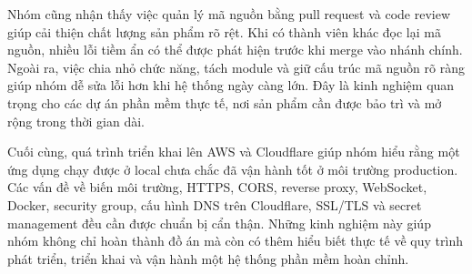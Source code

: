 \par Nhóm cũng nhận thấy việc quản lý mã nguồn bằng pull request và code review giúp cải thiện chất lượng sản phẩm rõ rệt. Khi có thành viên khác đọc lại mã nguồn, nhiều lỗi tiềm ẩn có thể được phát hiện trước khi merge vào nhánh chính. Ngoài ra, việc chia nhỏ chức năng, tách module và giữ cấu trúc mã nguồn rõ ràng giúp nhóm dễ sửa lỗi hơn khi hệ thống ngày càng lớn. Đây là kinh nghiệm quan trọng cho các dự án phần mềm thực tế, nơi sản phẩm cần được bảo trì và mở rộng trong thời gian dài.

\par Cuối cùng, quá trình triển khai lên AWS và Cloudflare giúp nhóm hiểu rằng một ứng dụng chạy được ở local chưa chắc đã vận hành tốt ở môi trường production. Các vấn đề về biến môi trường, HTTPS, CORS, reverse proxy, WebSocket, Docker, security group, cấu hình DNS trên Cloudflare, SSL/TLS và secret management đều cần được chuẩn bị cẩn thận. Những kinh nghiệm này giúp nhóm không chỉ hoàn thành đồ án mà còn có thêm hiểu biết thực tế về quy trình phát triển, triển khai và vận hành một hệ thống phần mềm hoàn chỉnh.